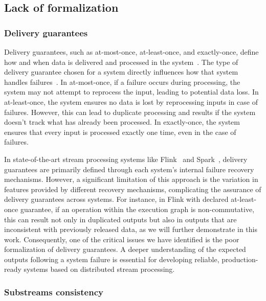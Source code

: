 \subsection{Lack of formalization}

\subsubsection{Delivery guarantees}

Delivery guarantees, such as at-most-once, at-least-once, and exactly-once, define how and when data is delivered and processed in the system~\cite{fragkoulis2024survey, carbone2018scalable, Akidau:2013:MFS:2536222.2536229}. The type of delivery guarantee chosen for a system directly influences how that system handles failures~\cite{zhang2024survey, silvestre2021clonos, wang2021consistency}. In at-most-once, if a failure occurs during processing, the system may not attempt to reprocess the input, leading to potential data loss. In at-least-once, the system ensures no data is lost by reprocessing inputs in case of failures. However, this can lead to duplicate processing and results if the system doesn't track what has already been processed. In exactly-once, the system ensures that every input is processed exactly one time, even in the case of failures.

In state-of-the-art stream processing systems like Flink~\cite{Carbone:2017:SMA:3137765.3137777} and Spark~\cite{Zaharia:2012:DSE:2342763.2342773}, delivery guarantees are primarily defined through each system's internal failure recovery mechanisms. However, a significant limitation of this approach is the variation in features provided by different recovery mechanisms, complicating the assurance of delivery guarantees across systems. For instance, in Flink with declared at-least-once guarantee, if an operation within the execution graph is non-commutative, this can result not only in duplicated outputs but also in outputs that are inconsistent with previously released data, as we will further demonstrate in this work. Consequently, one of the critical issues we have identified is the poor formalization of delivery guarantees. A deeper understanding of the expected outputs following a system failure is essential for developing reliable, production-ready systems based on distributed stream processing.

\subsubsection{Substreams consistency}

